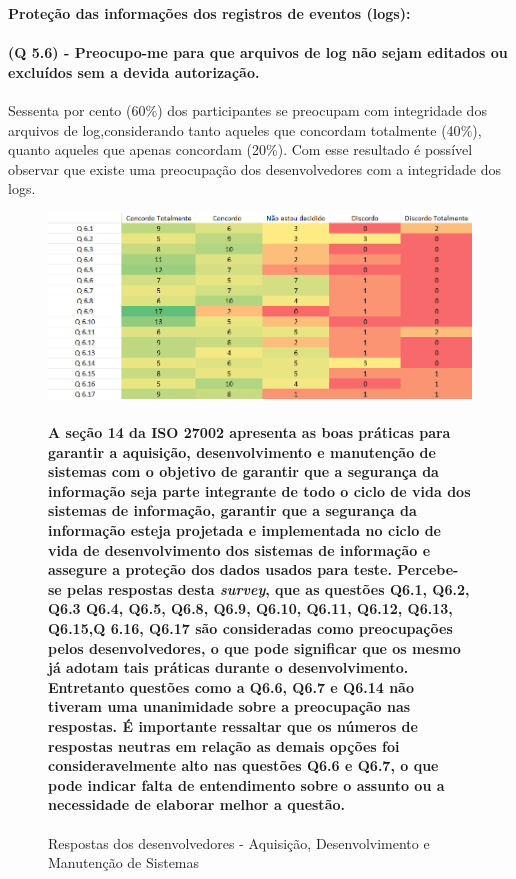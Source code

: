 \vspace{0.5cm}
\noindent\textbf{Proteção das informações dos registros de eventos (logs):}
\paragraph{\textbf{(Q 5.6)} - Preocupo-me para que arquivos de log não sejam editados ou excluídos sem a devida autorização.}

Sessenta por cento (60{\%}) dos participantes se preocupam com integridade dos arquivos de log,considerando tanto aqueles que concordam totalmente (40{\%}), quanto aqueles que apenas concordam (20{\%}). Com esse resultado é possível observar que existe uma preocupação dos desenvolvedores com a integridade dos logs.


\begin{figure}[H]
\includegraphics[scale=0.7]{fig/Mapa de calor 4.PNG}
\caption{Respostas dos desenvolvedores - Aquisição, Desenvolvimento e Manutenção de Sistemas}
\label{fig:4}
\paragraph{A seção 14 da ISO 27002 apresenta as boas práticas para  garantir a aquisição, desenvolvimento e manutenção de sistemas com o objetivo de garantir que a segurança da informação seja parte integrante de todo o ciclo de vida dos sistemas de informação, garantir que a segurança da informação esteja projetada e implementada no ciclo de vida de desenvolvimento dos sistemas de informação e assegure a proteção dos dados usados para teste. Percebe-se pelas respostas desta \textit{survey}, que as questões Q6.1, Q6.2, Q6.3 Q6.4, Q6.5, Q6.8, Q6.9, Q6.10, Q6.11, Q6.12, Q6.13, Q6.15,Q 6.16, Q6.17 são consideradas como preocupações pelos desenvolvedores, o que pode significar que os mesmo já adotam tais práticas durante o desenvolvimento. Entretanto questões como a Q6.6, Q6.7 e Q6.14 não tiveram uma unanimidade sobre a preocupação nas respostas. É importante ressaltar que os números de respostas neutras em relação as demais opções foi consideravelmente alto nas questões Q6.6 e Q6.7, o que pode indicar falta de entendimento sobre o assunto ou a necessidade de elaborar melhor a questão.}
\end{figure}

